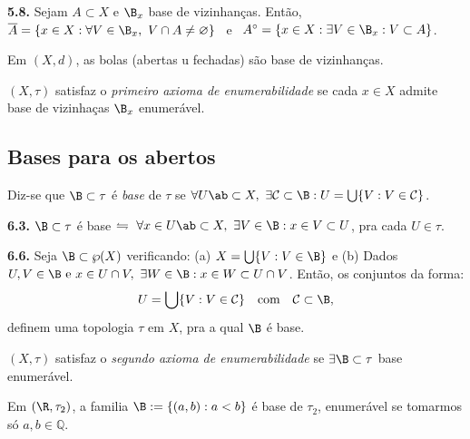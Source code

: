 \begin{proposition}
    \textbf{5.8.} Sejam \(A \subset X\) e \(\B_x\) base de vizinhanças. Então, \(\overline{A} = \{x \in X : \forall V \in \B_x, \ V\cap A \neq \varnothing\}\) \ e \ \(A^\circ = \{x \in X : \exists  V \in \B_x : V\subset A\}\).
\end{proposition}

\begin{example}
    Em \((X, d)\), as bolas (abertas u fechadas) são base de vizinhanças. 
\end{example}
\begin{definition}
    \((X, \tau)\) satisfaz o \emph{primeiro axioma de enumerabilidade} se cada \( x \in X\) admite base de vizinhaças \(\B_x\) enumerável.  
\end{definition}

\subsection*{Bases para os abertos}

\begin{definition}
    Diz-se que \(\B \subset \tau\) é \emph{base} de \(\tau \) se \(\forall U \ab \subset X, \ \exists \mathcal{C} \subset \B : U = \bigcup \{V : V \in \mathcal{C}\}\). 
\end{definition}

\begin{proposition}
    \textbf{6.3.} \(\B \subset \tau\) é base \(\leftrightharpoons \ \forall x \in U\ab\subset X, \  \exists V \in \B : x \in V \subset U\), pra cada \( U \in \tau \). 
\end{proposition}

\begin{proposition}
    \textbf{6.6.} Seja \(\B \subset \wp(X)\) verificando: (a) \(X = \bigcup\{V : V \in \B\}\) e (b) Dados \(U, V \in \B \text{ e } x \in U \cap V, \ \exists W \in \B : x \in W \subset U \cap V \). Então, os conjuntos da forma:  
    \[U = \bigcup \{V : V \in \mathcal{C}\} \text{ \ \ com \ \ } \mathcal{C} \subset \B,\]
    definem uma topologia \(\tau\) em \( X\), pra a qual \(\B\) é base. 
\end{proposition}

\begin{definition}
    \((X, \tau)\) satisfaz o \emph{segundo axioma de enumerabilidade} se \(\exists \B\subset \tau\) base enumerável.  
\end{definition}

\begin{example}
    Em \((\R, \tau_2)\), a familia \(\B := \{(a,b) : a < b\}\) é base de \(\tau_2\), enumerável se tomarmos só \(a,b \in \mathbb{Q}\).  
\end{example}

